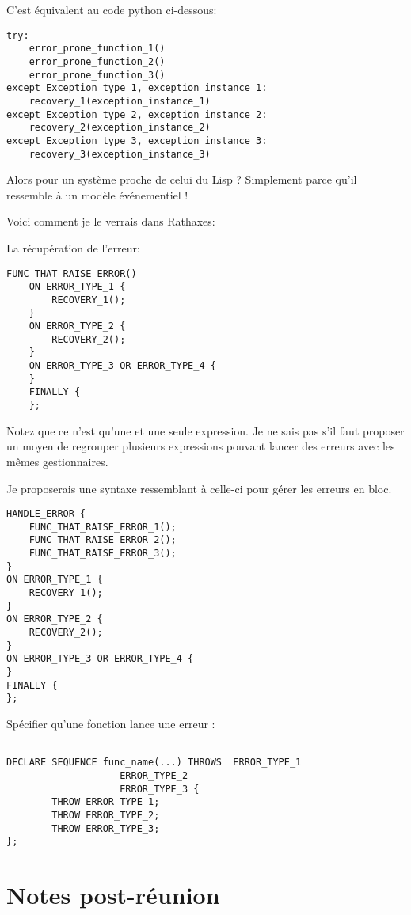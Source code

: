 \documentclass{rtxreport}
\begin{document}
C'est équivalent au code python ci-dessous:
\lstset{language=Python}
\begin{lstlisting}
try:
	error_prone_function_1()
	error_prone_function_2()
	error_prone_function_3()
except Exception_type_1, exception_instance_1:
	recovery_1(exception_instance_1)
except Exception_type_2, exception_instance_2:
	recovery_2(exception_instance_2)
except Exception_type_3, exception_instance_3:
	recovery_3(exception_instance_3)
\end{lstlisting}

\lstset{language=rathaxes}

Alors pour un système proche de celui du Lisp ?
Simplement parce qu'il ressemble à un modèle événementiel !

Voici comment je le verrais dans Rathaxes:

La récupération de l'erreur:
\begin{lstlisting}
FUNC_THAT_RAISE_ERROR()
	ON ERROR_TYPE_1 {
		RECOVERY_1();
	}
	ON ERROR_TYPE_2 {
		RECOVERY_2();
	}
	ON ERROR_TYPE_3 OR ERROR_TYPE_4 {
	}
	FINALLY {
	};
\end{lstlisting}

Notez que ce n’est qu’une et une seule expression. Je ne sais pas s’il faut
proposer un moyen de regrouper plusieurs expressions pouvant lancer des erreurs
avec les mêmes gestionnaires.

Je proposerais une syntaxe ressemblant à celle-ci pour gérer les erreurs en
bloc.

\begin{lstlisting}
HANDLE_ERROR {
	FUNC_THAT_RAISE_ERROR_1();
	FUNC_THAT_RAISE_ERROR_2();
	FUNC_THAT_RAISE_ERROR_3();
}
ON ERROR_TYPE_1 {
	RECOVERY_1();
}
ON ERROR_TYPE_2 {
	RECOVERY_2();
}
ON ERROR_TYPE_3 OR ERROR_TYPE_4 {
}
FINALLY {
};
\end{lstlisting}

Spécifier qu’une fonction lance une erreur :

\begin{lstlisting}

DECLARE SEQUENCE func_name(...) THROWS	ERROR_TYPE_1
					ERROR_TYPE_2
					ERROR_TYPE_3 {
		THROW ERROR_TYPE_1;
		THROW ERROR_TYPE_2;
		THROW ERROR_TYPE_3;
};

\end{lstlisting}

\section{Notes post-réunion}
\end{document}
